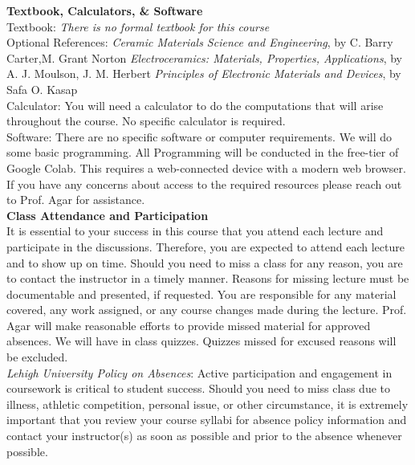 \documentclass[11pt,letterpaper]{article}
\newcommand{\lefthead}[2]{\noindent\textbf{#1}\hfill\\[#2]}
\begin{document}
\lefthead{Textbook, Calculators, \& Software}{0.3cm}
\noindent Textbook: \emph{There is no formal textbook for this course}\\

\noindent Optional References: \newline \emph{Ceramic Materials
Science and Engineering}, by C. Barry Carter,M. Grant Norton \newline \emph{Electroceramics: Materials, Properties, Applications}, by A. J. Moulson, J. M. Herbert
\newline \emph{Principles of Electronic Materials and Devices}, by Safa O. Kasap\\[0.1cm]

\noindent Calculator: You will need a calculator to do the computations that will arise throughout the course. No specific calculator is required. \\[0.1cm]


\noindent Software: There are no specific software or computer requirements. We will do some basic programming. All Programming will be conducted in the free-tier of Google Colab. This requires a web-connected device with a modern web browser.  \\[0.1cm]


\noindent If you have any concerns about access to the required resources please reach out to Prof. Agar for assistance. 
\\[0.3cm]


\lefthead{Class Attendance and Participation}{0.3cm}
 It is essential to your success in this course that you attend each lecture and participate in the discussions. Therefore, you are expected to attend each lecture and to show up on time. Should you need to miss a class for any reason, you are to contact the instructor in a timely manner. Reasons for missing lecture must be documentable and presented, if requested. You are responsible for any material covered, any work assigned, or any course changes made during the lecture. Prof. Agar will make reasonable efforts to provide missed material for approved absences. We will have in class quizzes. Quizzes missed for excused reasons will be excluded. \\

\noindent \emph{Lehigh University Policy on Absences}: Active participation and engagement in coursework is critical to student success. Should you need to miss class due to illness, athletic competition, personal issue, or other circumstance, it is extremely important that you review your course syllabi for absence policy information and contact your instructor(s) as soon as possible and prior to the absence whenever possible.
\end{document}
